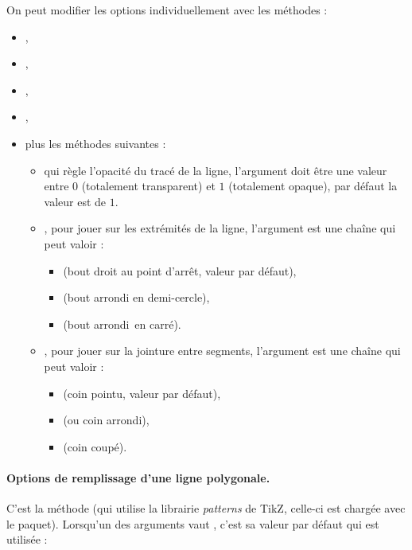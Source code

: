 On peut modifier les options individuellement avec les méthodes : 
\begin{itemize}
    \item {}, 
    \item {}, 
    \item {}, 
    \item {}, 
    \item plus les méthodes suivantes : 
        \begin{itemize}
            \item {} qui règle l'opacité du tracé de la ligne, l'argument  doit être une
valeur entre $0$ (totalement transparent) et $1$ (totalement opaque), par défaut la valeur est de $1$.
            \item {}, pour jouer sur les extrémités de la ligne, l'argument  est une chaîne qui peut valoir :
            \begin{itemize}
                \item {} (bout droit au point d'arrêt, valeur par défaut),
                \item {} (bout arrondi en demi-cercle),
                \item {} (bout \og arrondi\fg\ en carré).
            \end{itemize}
          
          \item {}, pour jouer sur la jointure entre segments, l'argument  est une chaîne qui peut valoir :
            \begin{itemize}
                \item {} (coin pointu, valeur par défaut),
                \item {} (ou coin arrondi),
                \item {} (coin coupé).
            \end{itemize}
        \end{itemize}
\end{itemize}


\paragraph{Options de remplissage d'une ligne polygonale.}

C'est la méthode  (qui utilise la librairie \emph{patterns} de TikZ, celle-ci est chargée avec le paquet). Lorsqu'un des arguments vaut \nil, c'est sa valeur par défaut qui est utilisée :

